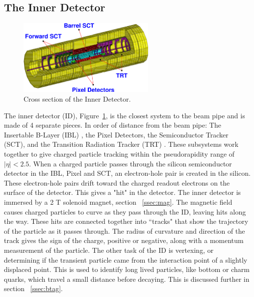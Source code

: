 \subsection{The Inner Detector}
\begin{figure}[h]
\begin{center}
\includegraphics*[width=0.60\textwidth] {figures/inner_3D}%
\caption[Cross section of the Inner Detector.]{Cross section of the Inner Detector.}
\label{fig:ID_cs}
\end{center}
\end{figure}
%
%
The inner detector (ID), Figure~\ref{fig:ID_cs}, is the closest system to the beam pipe and is made of 4 separate pieces. In order of distance from the beam pipe: The Insertable B-Layer (IBL) \cite{Capeans:1291633}, the Pixel Detectors, the Semiconductor Tracker (SCT), and the Transition Radiation Tracker (TRT) \cite{CERN-LHCC-97-016}. These subsystems work together to give charged particle tracking within the pseudorapidity range of ${|\eta| < 2.5}$. When a charged particle passes through the silicon semiconductor detector in the IBL, Pixel and SCT, an electron-hole pair is created in the silicon. These electron-hole pairs drift toward the charged readout electrons on the surface of the detector. This gives a "hit" in the detector. The inner detector is immersed by a 2 T solenoid magnet, section ~\ref{ssec:mag}. The magnetic field causes charged particles to curve as they pass through the ID, leaving hits along the way. These hits are connected together into ``tracks" that show the trajectory of the particle as it passes through. The radius of curvature and direction of the track gives the sign of the charge, positive or negative, along with a momentum measurement of the particle. The other task of the ID is vertexing, or determining if the transient particle came from the interaction point of a slightly displaced point. This is used to identify long lived particles, like bottom or charm quarks, which travel a small distance before decaying. This is discussed further in section ~\ref{ssec:btag}. \linebreak
